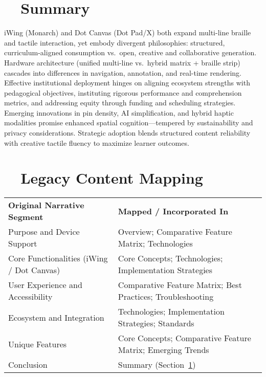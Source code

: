 \section{~~Summary}
\label{sec:sr29-summary}
iWing (Monarch) and Dot Canvas (Dot Pad/X) both expand multi-line braille and tactile interaction, yet embody divergent philosophies: structured, curriculum-aligned consumption vs.\ open, creative and collaborative generation. Hardware architecture (unified multi-line vs.\ hybrid matrix + braille strip) cascades into differences in navigation, annotation, and real-time rendering. Effective institutional deployment hinges on aligning ecosystem strengths with pedagogical objectives, instituting rigorous performance and comprehension metrics, and addressing equity through funding and scheduling strategies. Emerging innovations in pin density, AI simplification, and hybrid haptic modalities promise enhanced spatial cognition—tempered by sustainability and privacy considerations. Strategic adoption blends structured content reliability with creative tactile fluency to maximize learner outcomes.

\section{~~Legacy Content Mapping}
\label{sec:sr29-legacy-mapping}
\begin{tabular}{p{} p{}}
	\textbf{Original Narrative Segment}       & \textbf{Mapped / Incorporated In}                           \\
	Purpose and Device Support                & Overview; Comparative Feature Matrix; Technologies          \\
	Core Functionalities (iWing / Dot Canvas) & Core Concepts; Technologies; Implementation Strategies      \\
	User Experience and Accessibility         & Comparative Feature Matrix; Best Practices; Troubleshooting \\
	Ecosystem and Integration                 & Technologies; Implementation Strategies; Standards          \\
	Unique Features                           & Core Concepts; Comparative Feature Matrix; Emerging Trends  \\
	Conclusion                                & Summary (Section~\ref{sec:sr29-summary})                    \\
\end{tabular}

